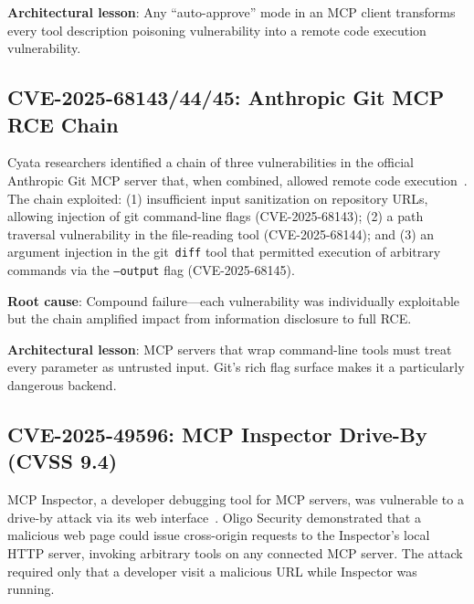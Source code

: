 \documentclass[11pt,twocolumn]{article}
\begin{document}
\textbf{Architectural lesson}: Any ``auto-approve'' mode in an MCP client transforms every tool description poisoning vulnerability into a remote code execution vulnerability.


\subsection{CVE-2025-68143/44/45: Anthropic Git MCP RCE Chain}

Cyata researchers identified a chain of three vulnerabilities in the official Anthropic Git MCP server that, when combined, allowed remote code execution~\cite{cve-2025-68143}. The chain exploited: (1) insufficient input sanitization on repository URLs, allowing injection of git command-line flags (CVE-2025-68143); (2) a path traversal vulnerability in the file-reading tool (CVE-2025-68144); and (3) an argument injection in the git~\texttt{diff} tool that permitted execution of arbitrary commands via the \texttt{--output} flag (CVE-2025-68145).

\textbf{Root cause}: Compound failure---each vulnerability was individually exploitable but the chain amplified impact from information disclosure to full RCE.

\textbf{Architectural lesson}: MCP servers that wrap command-line tools must treat every parameter as untrusted input. Git's rich flag surface makes it a particularly dangerous backend.


\subsection{CVE-2025-49596: MCP Inspector Drive-By (CVSS 9.4)}

MCP Inspector, a developer debugging tool for MCP servers, was vulnerable to a drive-by attack via its web interface~\cite{cve-2025-49596}. Oligo Security demonstrated that a malicious web page could issue cross-origin requests to the Inspector's local HTTP server, invoking arbitrary tools on any connected MCP server. The attack required only that a developer visit a malicious URL while Inspector was running.
\end{document}
